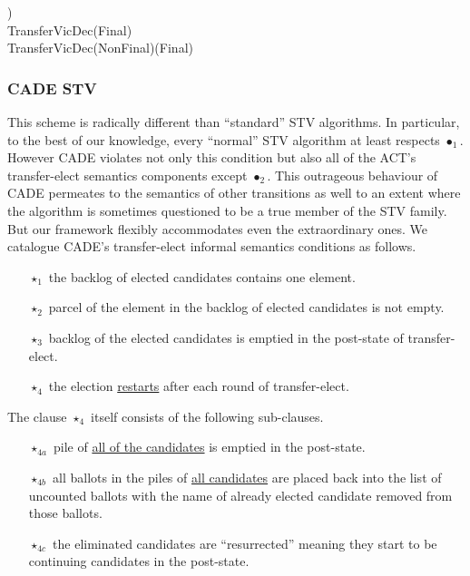 \documentclass[10pt,conference]{IEEEtran}
\renewcommand{\HOLConst}[1]{{\textsf{\upshape #1}}}
\renewcommand{\HOLSymConst}[1]{\HOLConst{#1}}
\begin{document}
\begin{small}
\begin{holthmenv}
\;\;\;\;\;\HOLConst{subpile1}\;\;\;\;\HOLSymConst{\HOLTokenConj{}}\;\HOLConst{subpile2}\;\;\;)\\
\HOLConst{TransferVicDec}\;\;(\HOLConst{Final}\;)\;\;\HOLSymConst{\HOLTokenEquiv{}}\;\HOLConst{F}\\
\HOLConst{TransferVicDec}\;\;(\HOLConst{NonFinal}\;)\;(\HOLConst{Final}\;)\;\HOLSymConst{\HOLTokenEquiv{}}\;\HOLConst{F}
\end{holthmenv}
\end{small}
\subsubsection{CADE STV}
This scheme is radically different than ``standard'' STV algorithms. In particular, to the best of our knowledge, every ``normal'' STV algorithm at least respects $\bullet_{1}$. However CADE violates not only this condition but also all of the ACT's transfer-elect semantics components except $\bullet_{2}$. This outrageous behaviour of CADE permeates to the semantics of other transitions as well to an extent where the algorithm is sometimes questioned to be a true member  of the STV family. But our framework flexibly  accommodates even the extraordinary ones. We catalogue CADE's transfer-elect informal semantics  conditions as follows.
\begin{itemize}
\item[$\star_{1}$] the backlog of  elected candidates contains one element.
\item[$\star_{2}$] parcel of the element in the backlog of elected candidates is not empty.
\item[$\star_{3}$] backlog of the elected candidates is emptied in the post-state of transfer-elect.
\item[$\star_{4}$] the election \underline{restarts} after each round of transfer-elect.
\end{itemize}  
The clause $\star_{4}$ itself consists of the following sub-clauses.
\begin{itemize}
\item[$\star_{4a}$] pile of \underline{all of the candidates} is emptied in the post-state.
\item[$\star_{4b}$] all ballots in the piles of \underline{all candidates} are placed back into the list of uncounted ballots with the name of already elected candidate removed from those ballots.
\item[$\star_{4c}$] the eliminated candidates are ``resurrected'' meaning they start to be continuing candidates in the post-state.  
\end{itemize}
\end{document}
